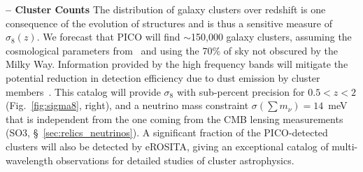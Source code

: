 \documentclass[PICOAPC.tex]{subfiles}
\begin{document}
{\bf -- Cluster Counts} \hspace{0.1in} \label{clusters}  
The distribution of galaxy clusters over redshift is one consequence of the evolution of structures and is thus a sensitive measure of $\sigma_{8}(z)$. 
We forecast that PICO will find $\sim$150,000 galaxy clusters, assuming the cosmological parameters from \planck\  and using the 70\% of sky not obscured by the Milky Way.  Information provided by the high frequency bands will mitigate the potential reduction in detection efficiency due to dust emission by cluster members~\citep{melin_2018}. 
This catalog will provide $\sigma_{8}$ with sub-percent precision for $0.5 < z < 2$ (Fig.~\ref{fig:sigma8}, right), and a neutrino mass constraint $\sigma(\sum m_{\nu}) = 14$~meV that is independent from the one coming from the CMB lensing measurements (SO3, \S~\ref{sec:relics_neutrinos}). A significant fraction of the PICO-detected clusters will also be detected by eROSITA, giving an exceptional catalog of multi-wavelength observations for detailed studies of cluster astrophysics. 
\end{document}
